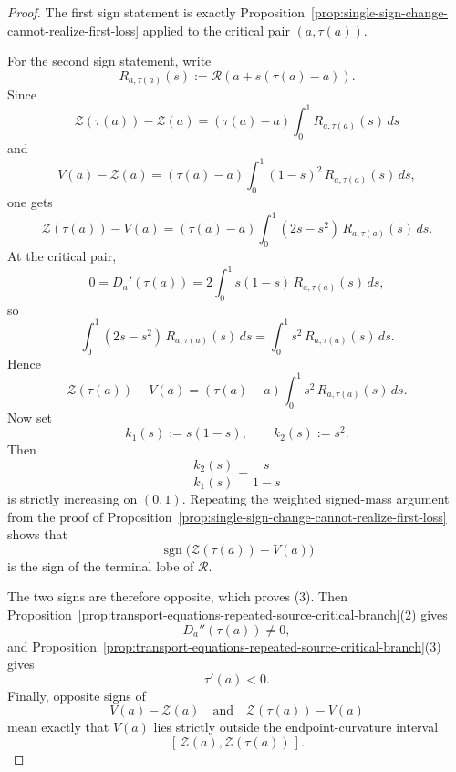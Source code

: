 \documentclass[11pt,a4paper]{amsart}
\theoremstyle{plain}
\theoremstyle{definition}
\begin{document}
\begin{proof}
The first sign statement is exactly
Proposition~\ref{prop:single-sign-change-cannot-realize-first-loss} applied to
the critical pair $(a,\tau(a))$.

For the second sign statement, write
\[
R_{a,\tau(a)}(s):=\mathcal R(a+s(\tau(a)-a)).
\]
Since
\[
\mathcal Z(\tau(a))-\mathcal Z(a)
=
(\tau(a)-a)\int_0^1 R_{a,\tau(a)}(s)\,ds
\]
and
\[
V(a)-\mathcal Z(a)
=
(\tau(a)-a)\int_0^1 (1-s)^2\,R_{a,\tau(a)}(s)\,ds,
\]
one gets
\[
\mathcal Z(\tau(a))-V(a)
=
(\tau(a)-a)\int_0^1 (2s-s^2)\,R_{a,\tau(a)}(s)\,ds.
\]
At the critical pair,
\[
0=D_a'(\tau(a))
=
2\int_0^1 s(1-s)\,R_{a,\tau(a)}(s)\,ds,
\]
so
\[
\int_0^1 (2s-s^2)\,R_{a,\tau(a)}(s)\,ds
=
\int_0^1 s^2\,R_{a,\tau(a)}(s)\,ds.
\]
Hence
\[
\mathcal Z(\tau(a))-V(a)
=
(\tau(a)-a)\int_0^1 s^2\,R_{a,\tau(a)}(s)\,ds.
\]
Now set
\[
k_1(s):=s(1-s),
\qquad
k_2(s):=s^2.
\]
Then
\[
\frac{k_2(s)}{k_1(s)}=\frac{s}{1-s}
\]
is strictly increasing on $(0,1)$. Repeating the weighted signed-mass argument
from the proof of
Proposition~\ref{prop:single-sign-change-cannot-realize-first-loss} shows that
\[
\operatorname{sgn}\bigl(\mathcal Z(\tau(a))-V(a)\bigr)
\]
is the sign of the terminal lobe of $\mathcal R$.

The two signs are therefore opposite, which proves (3). Then
Proposition~\ref{prop:transport-equations-repeated-source-critical-branch}(2)
gives
\[
D_a''(\tau(a))\neq 0,
\]
and
Proposition~\ref{prop:transport-equations-repeated-source-critical-branch}(3)
gives
\[
\tau'(a)<0.
\]
Finally, opposite signs of
\[
V(a)-\mathcal Z(a)
\quad\text{and}\quad
\mathcal Z(\tau(a))-V(a)
\]
mean exactly that $V(a)$ lies strictly outside the endpoint-curvature interval
\[
[\,\mathcal Z(a),\mathcal Z(\tau(a))\,].
\]
\end{proof}
\end{document}
